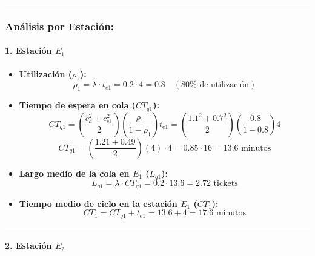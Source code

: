 \documentclass[
]{article}
\providecommand{\tightlist}{%
  \setlength{\itemsep}{0pt}\setlength{\parskip}{0pt}}
\begin{document}
\begin{center}\rule{0.5\linewidth}{0.5pt}\end{center}

\hypertarget{anuxe1lisis-por-estaciuxf3n}{%
\subsubsection{Análisis por
Estación:}\label{anuxe1lisis-por-estaciuxf3n}}

\hypertarget{estaciuxf3n-e_1}{%
\paragraph{\texorpdfstring{1. Estación
\(E_1\)}{1. Estación E\_1}}\label{estaciuxf3n-e_1}}

\begin{itemize}
\tightlist
\item
  \textbf{Utilización (\(\rho_1\)):}
  \[\rho_1 = \lambda \cdot t_{e1} = 0.2 \cdot 4 = 0.8 \quad (80\% \text{ de utilización})\]
\item
  \textbf{Tiempo de espera en cola (\(CT_{q1}\)):}
  \[CT_{q1} = \left( \frac{c_a^2 + c_{e1}^2}{2} \right) \left( \frac{\rho_1}{1 - \rho_1} \right) t_{e1} = \left( \frac{1.1^2 + 0.7^2}{2} \right) \left( \frac{0.8}{1 - 0.8} \right) 4\]
  \[CT_{q1} = \left( \frac{1.21 + 0.49}{2} \right) (4) \cdot 4 = 0.85 \cdot 16 = 13.6 \text{ minutos}\]
\item
  \textbf{Largo medio de la cola en \(E_1\) (\(L_{q1}\)):}
  \[L_{q1} = \lambda \cdot CT_{q1} = 0.2 \cdot 13.6 = 2.72 \text{ tickets}\]
\item
  \textbf{Tiempo medio de ciclo en la estación \(E_1\) (\(CT_1\)):}
  \[CT_1 = CT_{q1} + t_{e1} = 13.6 + 4 = 17.6 \text{ minutos}\]
\end{itemize}

\begin{center}\rule{0.5\linewidth}{0.5pt}\end{center}

\hypertarget{estaciuxf3n-e_2}{%
\paragraph{\texorpdfstring{2. Estación
\(E_2\)}{2. Estación E\_2}}\label{estaciuxf3n-e_2}}
\end{document}
